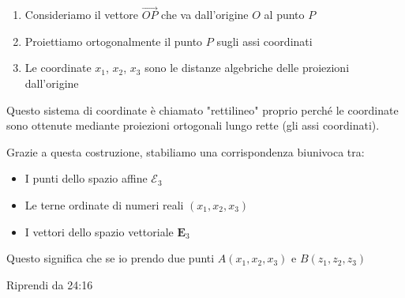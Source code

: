 \documentclass{article}
\theoremstyle{plain}
\theoremstyle{definition}
\theoremstyle{remark}
\begin{document}
\begin{enumerate}
    \item Consideriamo il vettore $\overrightarrow{OP}$ che va dall'origine $O$ al punto $P$
    \item Proiettiamo ortogonalmente il punto $P$ sugli assi coordinati
    \item Le coordinate $x_1$, $x_2$, $x_3$ sono le distanze algebriche delle proiezioni dall'origine
\end{enumerate}

\begin{center}
\end{center}

Questo sistema di coordinate è chiamato "rettilineo" proprio perché le coordinate sono ottenute mediante proiezioni ortogonali lungo rette (gli assi coordinati).

Grazie a questa costruzione, stabiliamo una corrispondenza biunivoca tra:
\begin{itemize}
    \item I punti dello spazio affine $\mathcal{E}_3$
    \item Le terne ordinate di numeri reali $(x_1,x_2,x_3)$
    \item I vettori dello spazio vettoriale $\mathbf{E}_3$
\end{itemize}

Questo significa che se io prendo due punti $A(x_1,x_2,x_3)$ e $B(z_1,z_2,z_3)$

Riprendi da 24:16
\end{document}

